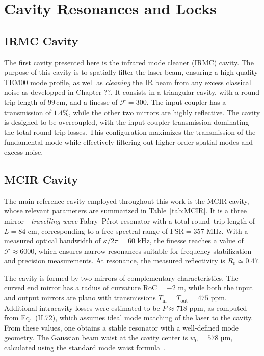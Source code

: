 \section{Cavity Resonances and Locks}

\subsection{IRMC Cavity}
The first cavity presented here is the infrared mode cleaner (IRMC) cavity. The purpose of this cavity is to spatially filter the laser beam, ensuring a high-quality TEM00 mode profile, as well as \textit{cleaning} the IR beam from any excess classical noise as developped in Chapter ??. It consists in a triangular cavity, with a round trip length of $99\,\mathrm{cm}$, and a finesse of $\mathcal{F} = 300$. The input coupler has a transmission of $1.4 \%$, while the other two mirrors are highly reflective. The cavity is designed to be overcoupled, with the input coupler transmission dominating the total round-trip losses. This configuration maximizes the transmission of the fundamental mode while effectively filtering out higher-order spatial modes and excess noise.

\subsection*{MCIR Cavity}

The main reference cavity employed throughout this work is the MCIR cavity, whose relevant parameters are summarized in Table~\ref{tab:MCIR}. 
It is a three mirror - \textit{travelling wave} Fabry--Pérot resonator with a total round--trip length of $L = 84$ cm, corresponding to a free spectral range of 
$\mathrm{FSR} = 357$ MHz. With a measured optical bandwidth of $\kappa/2\pi = 60$ kHz, the finesse reaches a value of 
$\mathcal{F} \approx 6000$, which ensures narrow resonances suitable for frequency stabilization and precision measurements. 
At resonance, the measured reflectivity is $R_0 \simeq 0.47$. 

The cavity is formed by two mirrors of complementary characteristics. 
The curved end mirror has a radius of curvature $\mathrm{RoC} = -2$ m, while both the input and output mirrors are plano with transmissions 
$T_\mathrm{in} = T_\mathrm{out} = 475$ ppm. Additional intracavity losses were estimated to be $P \approx 718$ ppm, as computed from 
Eq.~(II.72), which assumes ideal mode matching of the laser to the cavity.  
From these values, one obtains a stable resonator with a well-defined mode geometry. The Gaussian beam waist at the cavity center is 
$w_0 = 578$ µm, calculated using the standard mode waist formula~\cite{ref:68}.  

